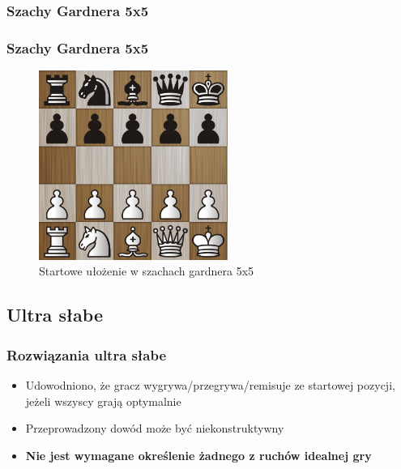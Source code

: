 \documentclass[polish,envcountsect,10pt]{beamer}
\begin{document}
            \subsubsection{Szachy Gardnera 5x5}
                \begin{frame}
                    \frametitle{Szachy Gardnera 5x5}
                    \begin{figure}[H]
                        \centering
                        \includegraphics[width=0.55\textwidth]{images/gardner.png}
                        \caption{Startowe ułożenie w szachach gardnera 5x5}
                    \end{figure}
                \end{frame}

        \subsection{Ultra słabe}
            \begin{frame}
                \frametitle{Rozwiązania ultra słabe}
                \begin{itemize}
                    \item<1-> Udowodniono, że gracz wygrywa/przegrywa/remisuje ze startowej pozycji, jeżeli wszyscy grają optymalnie
                    \item<2-> Przeprowadzony dowód może być niekonstruktywny
                    \item<3-> \textbf{Nie jest wymagane określenie żadnego z ruchów idealnej gry}
                \end{itemize}
            \end{frame}
\end{document}
